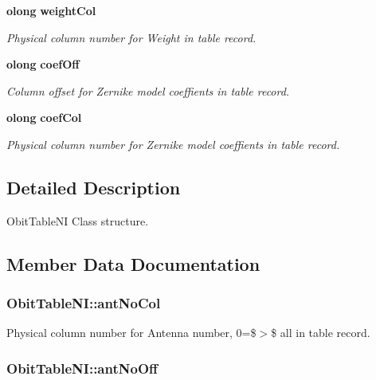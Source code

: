 \begin{CompactItemize}
{\bf olong} {\bf weight\-Col}
\begin{CompactList}\small\item\em Physical column number for Weight in table record. \item\end{CompactList}\item 
{\bf olong} {\bf coef\-Off}
\begin{CompactList}\small\item\em Column offset for Zernike model coeffients in table record. \item\end{CompactList}\item 
{\bf olong} {\bf coef\-Col}
\begin{CompactList}\small\item\em Physical column number for Zernike model coeffients in table record. \item\end{CompactList}\end{CompactItemize}


\subsection{Detailed Description}
Obit\-Table\-NI Class structure. 



\subsection{Member Data Documentation}
\subsubsection{ {\bf Obit\-Table\-NI::ant\-No\-Col}}\label{structObitTableNI_o24}


Physical column number for Antenna number, 0=\$$>$\$ all in table record. 

\subsubsection{ {\bf Obit\-Table\-NI::ant\-No\-Off}}\label{structObitTableNI_o23}



